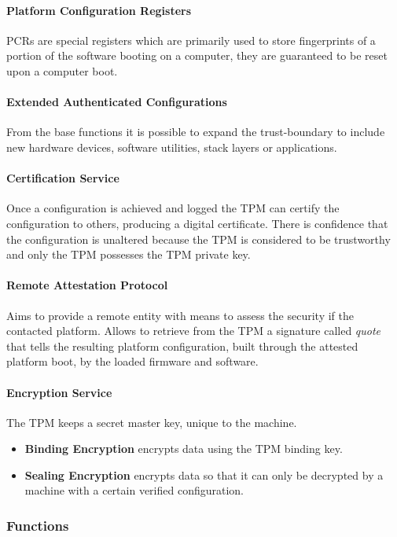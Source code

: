 \paragraph{Platform Configuration Registers}
PCRs are special registers which are primarily used to store fingerprints of a portion of the software booting on a computer,
they are guaranteed to be reset upon a computer boot.

\paragraph{Extended Authenticated Configurations}
From the base functions it is possible to expand the trust-boundary to include new hardware devices,
software utilities, stack layers or applications.

\paragraph{Certification Service}
Once a configuration is achieved and logged the TPM can certify the configuration to others, producing a digital certificate.
There is confidence that the configuration is unaltered because the TPM is considered to be trustworthy and only the TPM possesses the TPM private key.

\paragraph{Remote Attestation Protocol}
Aims to provide a remote entity with means to assess the security if the contacted platform.
Allows to retrieve from the TPM a signature called \textit{quote} that tells the resulting platform configuration,
built through the attested platform boot, by the loaded firmware and software.

\paragraph{Encryption Service}
The TPM keeps a secret master key, unique to the machine.
\begin{itemize}
    \item \textbf{Binding Encryption} encrypts data using the TPM binding key.
    \item \textbf{Sealing Encryption} encrypts data so that it can only be decrypted by a machine with a certain verified configuration.
\end{itemize}

\subsubsection{Functions}
